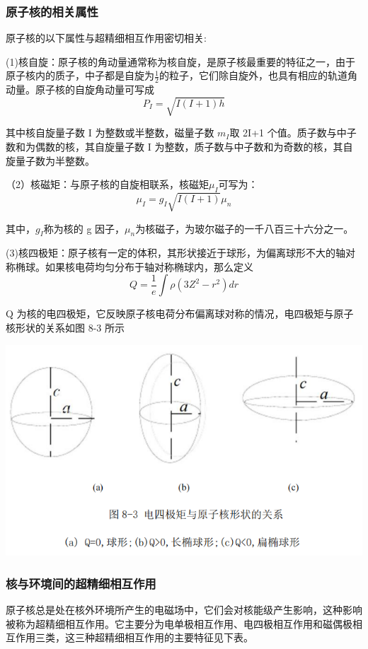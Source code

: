 \documentclass[hyperref]{ctexart}
\begin{document}
\begin{multicols}{2}
	\subsubsection{原子核的相关属性}
	原子核的以下属性与超精细相互作用密切相关:
	
	(1)核自旋：原子核的角动量通常称为核自旋，是原子核最重要的特征之一，由于原子核内的质子，中子都是自旋为$\frac1 2$的粒子，它们除自旋外，也具有相应的轨道角动量。原子核的自旋角动量可写成
	\begin{equation}
	P_I=\sqrt{I(I+1)h}
	\end{equation}
	
	其中核自旋量子数 I 为整数或半整数，磁量子数 $m_I$取 2I+1 个值。质子数与中子数和为偶数的核，其自旋量子数 I 为整数，质子数与中子数和为奇数的核，其自旋量子数为半整数。

	（2）核磁矩：与原子核的自旋相联系，核磁矩$\mu_I$可写为：
	\begin{equation}
	\mu_I=g_I\sqrt{I(I+1)}\mu_n 
	\end{equation}
	
	其中，$g_I$称为核的 g 因子，$\mu_n$为核磁子，为玻尔磁子的一千八百三十六分之一。

	(3)核四极矩：原子核有一定的体积，其形状接近于球形，为偏离球形不大的轴对称椭球。如果核电荷均匀分布于轴对称椭球内，那么定义
	\begin{equation}
	Q=\frac{1}{e}\int\rho(3Z^2-r^2)dr
	\end{equation}

	Q 为核的电四极矩，它反映原子核电荷分布偏离球对称的情况，电四极矩与原子核形状的关系如图 8-3 所示

	\begin{center}\includegraphics[scale=0.3]{t83.png}\end{center}
	\subsubsection{核与环境间的超精细相互作用}
	原子核总是处在核外环境所产生的电磁场中，它们会对核能级产生影响，这种影响被称为超精细相互作用。它主要分为电单极相互作用、电四极相互作用和磁偶极相互作用三类，这三种超精细相互作用的主要特征见下表。


\end{multicols}
\end{document}
